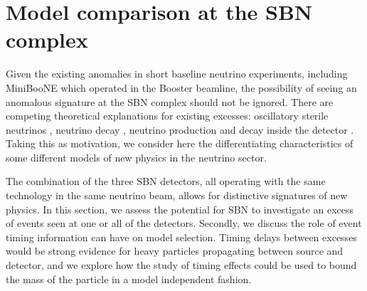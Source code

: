 \documentclass[11pt, a4paper]{article}
\begin{document}
%
%
%
%
%


\section{\label{sec:baselineinterplay}Model comparison at the SBN complex}

Given the existing anomalies in short baseline neutrino experiments, including
MiniBooNE which operated in the Booster beamline, the possibility of seeing an
anomalous signature at the SBN complex should not be ignored. There are
competing theoretical explanations for existing excesses: oscillatory sterile
neutrinos \cite{Everyone...}, neutrino decay \cite{Pascoli, Schwetz}, neutrino
production and decay inside the detector \cite{Gninenko, Meloni, Us?}. Taking 
this as motivation, we consider here the differentiating characteristics of some 
different models of new physics in the neutrino sector. 

The combination of the three SBN detectors, all operating with the same
technology in the same neutrino beam, allows for distinctive signatures of new
physics. In this section, we assess the potential for SBN to investigate an
excess of events seen at one or all of the detectors. 
%
Secondly, we discuss the role of event timing information can
have on model selection.  Timing delays between excesses would be strong
evidence for heavy particles propagating between source and detector, and we
explore how the study of timing effects could be used to bound the mass of the
particle in a model independent fashion.
\end{document}
